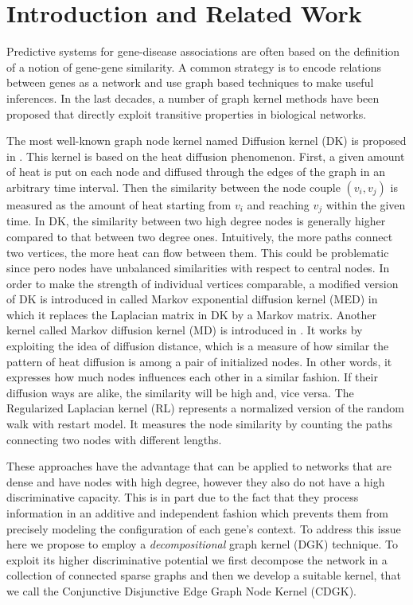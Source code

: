\documentclass{esannV2}
\begin{document}
\section{Introduction and Related Work} \label{introduction}
Predictive systems for gene-disease associations are often based on the definition of a notion of gene-gene similarity. A common strategy is to encode relations between genes as a network and use graph based techniques to make useful inferences. In the last decades, a number of graph kernel methods have been proposed that directly exploit transitive properties in biological networks. 

The most well-known graph node kernel named Diffusion kernel (DK) is proposed in \cite{ledk}. This kernel is based on the heat diffusion phenomenon. First, a given amount of heat is put on each node and diffused through the edges of the graph in an arbitrary time interval. Then the similarity between the node couple $(v_{i}, v_{j})$ is measured as the amount of heat starting from $v_{i}$ and reaching $v_{j}$ within the given time. In DK, the similarity between two high degree nodes is generally higher compared to that between two degree ones. Intuitively, the more paths connect two vertices, the more heat can flow between them. This could be problematic since pero nodes have unbalanced similarities with respect to central nodes. In order to make the strength of individual vertices comparable, a modified version of DK is introduced in \cite{medk} called Markov exponential diffusion kernel (MED) in which it replaces the Laplacian matrix in DK by a Markov matrix.  Another kernel called Markov diffusion kernel (MD) is introduced in \cite{mdk}. It works by exploiting the idea of diffusion distance, which is a measure of how similar the pattern of heat diffusion is among a pair of initialized nodes. In other words, it expresses how much nodes influences each other in a similar fashion. If their diffusion ways are alike, the similarity will be high and, vice versa. The Regularized Laplacian kernel (RL) \cite{rlk} represents a normalized version of the random walk with restart model. It measures the node similarity by counting the paths connecting two nodes with different lengths.

These approaches have the advantage that can be applied to networks that are dense and have nodes with high degree, however they also do not have a high discriminative capacity. This is in part due to the fact that they process information in an additive and independent fashion which prevents them from precisely modeling the configuration of each gene's context. To address this issue here we propose to employ a {\em decompositional} graph kernel (DGK) \cite{covolution_kernel} technique. To exploit its higher discriminative potential we first decompose the network in a collection of connected sparse graphs and then we develop a suitable kernel, that we call the Conjunctive Disjunctive Edge Graph Node Kernel (CDGK).
\end{document}
